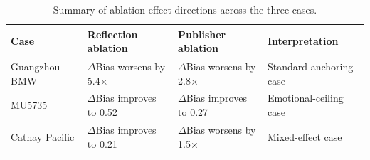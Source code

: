 \begin{table}[t]
\centering
\caption{Summary of ablation-effect directions across the three cases.}
\label{tab:ablation_summary}
\begin{tabular}{llll}
\toprule
Case & Reflection ablation & Publisher ablation & Interpretation \\
\midrule
Guangzhou BMW & $\Delta$Bias worsens by 5.4$\times$ & $\Delta$Bias worsens by 2.8$\times$ & Standard anchoring case \\
MU5735 & $\Delta$Bias improves to 0.52 & $\Delta$Bias improves to 0.27 & Emotional-ceiling case \\
Cathay Pacific & $\Delta$Bias improves to 0.21 & $\Delta$Bias worsens by 1.5$\times$ & Mixed-effect case \\
\bottomrule
\end{tabular}
\end{table}
